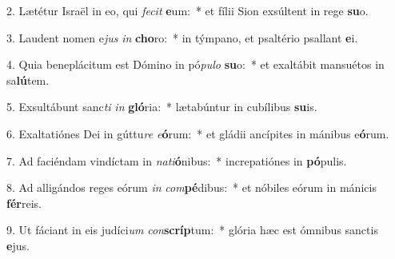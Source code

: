 2. Lætétur Israël in eo, qui \textit{fe}\textit{cit} \textbf{e}um:~*  et fílii Sion exsúltent in rege \textbf{su}o.\

3. Laudent nomen e\textit{jus} \textit{in} \textbf{cho}ro:~*  in týmpano, et psaltério psallant \textbf{e}i.\

4. Quia beneplácitum est Dómino in pó\textit{pu}\textit{lo} \textbf{su}o:~*  et exaltábit mansuétos in sa\textbf{lú}tem.\

5. Exsultábunt sanc\textit{ti} \textit{in} \textbf{gló}ria:~*  lætabúntur in cubílibus \textbf{su}is.\

6. Exaltatiónes Dei in gúttu\textit{re} \textit{e}\textbf{ó}rum:~*  et gládii ancípites in mánibus e\textbf{ó}rum.\

7. Ad faciéndam vindíctam in \textit{na}\textit{ti}\textbf{ó}nibus:~*  increpatiónes in \textbf{pó}pulis.\

8. Ad alligándos reges eórum \textit{in} \textit{com}\textbf{pé}dibus:~*  et nóbiles eórum in mánicis \textbf{fér}reis.\

9. Ut fáciant in eis judíci\textit{um} \textit{con}\textbf{scríp}tum:~*  glória hæc est ómnibus sanctis \textbf{e}jus.\

